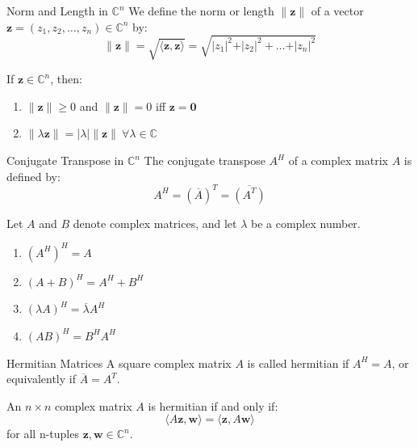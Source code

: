 \documentclass[12pt]{article}
\begin{document}
\begin{definition}{Norm and Length in $ \mathbb{C}^n $}{}
    We define the norm or length $ \lVert \mathbf{z} \rVert $ of a vector $ \mathbf{z} = \left( z_1, z_2, \dots, z_n \right) \in \mathbb{C}^n $ by:
    \[ \lVert \mathbf{z} \rVert = \sqrt{\langle \mathbf{z}, \mathbf{z} \rangle} = \sqrt{\vert z_1 \vert^2 + \vert z_2 \vert^2 + \dots + \vert z_n \vert^2} \]
\end{definition}

\begin{theorem}{}{}
    If $ \mathbf{z} \in \mathbb{C}^n $, then:
    \begin{enumerate}[label=(\roman*)]
        \item $ \lVert \mathbf{z} \rVert \geq 0 $ and $ \lVert \mathbf{z} \rVert = 0 $ iff $ \mathbf{z} = \mathbf{0} $
        \item $ \lVert \lambda \mathbf{z} \rVert = \vert \lambda \vert \lVert \mathbf{z} \rVert \ \forall \lambda \in \mathbb{C} $
    \end{enumerate}
\end{theorem}

\begin{definition}{Conjugate Transpose in $ \mathbb{C}^n $}{}
    The conjugate transpose $ A^H $ of a complex matrix $ A $ is defined by:
    \[ A^H = \left( \overline{A} \right)^T = \overline{\left( A^T \right)} \]
\end{definition}

\begin{theorem}{}{}
    Let $ A $ and $ B $ denote complex matrices, and let $ \lambda $ be a complex number.
    \begin{enumerate}[label=(\roman*)]
        \item $ \left( A^H \right)^H = A $
        \item $ \left( A + B \right)^H = A^H + B^H $
        \item $ \left( \lambda A \right)^H = \overline{\lambda} A^H $
        \item $ \left( AB \right)^H = B^H A^H $
    \end{enumerate}
\end{theorem}

\begin{definition}{Hermitian Matrices}{}
    A square complex matrix $ A $ is called hermitian if $ A^H = A $, or equivalently if $ \overline{A} = A^T $.
\end{definition}

\begin{theorem}{}{}
    An $ n \times n $ complex matrix $ A $ is hermitian if and only if:
    \[ \langle A \mathbf{z}, \mathbf{w} \rangle = \langle \mathbf{z}, A \mathbf{w} \rangle \]
    for all n-tuples $ \mathbf{z}, \mathbf{w} \in \mathbb{C}^n $.
\end{theorem}
\end{document}
